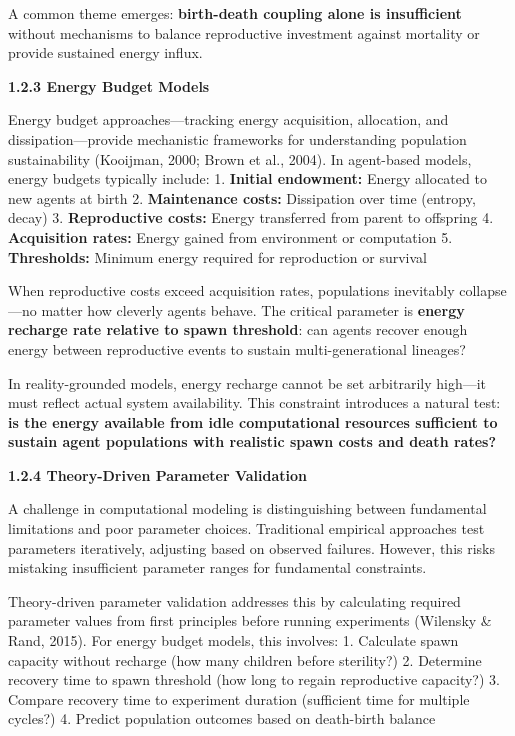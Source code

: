 \documentclass[
]{article}
\begin{document}
A common theme emerges: \textbf{birth-death coupling alone is
insufficient} without mechanisms to balance reproductive investment
against mortality or provide sustained energy influx.

\textbf{1.2.3 Energy Budget Models}

Energy budget approaches---tracking energy acquisition, allocation, and
dissipation---provide mechanistic frameworks for understanding
population sustainability (Kooijman, 2000; Brown et al., 2004). In
agent-based models, energy budgets typically include: 1. \textbf{Initial
endowment:} Energy allocated to new agents at birth 2.
\textbf{Maintenance costs:} Dissipation over time (entropy, decay) 3.
\textbf{Reproductive costs:} Energy transferred from parent to offspring
4. \textbf{Acquisition rates:} Energy gained from environment or
computation 5. \textbf{Thresholds:} Minimum energy required for
reproduction or survival

When reproductive costs exceed acquisition rates, populations inevitably
collapse---no matter how cleverly agents behave. The critical parameter
is \textbf{energy recharge rate relative to spawn threshold}: can agents
recover enough energy between reproductive events to sustain
multi-generational lineages?

In reality-grounded models, energy recharge cannot be set arbitrarily
high---it must reflect actual system availability. This constraint
introduces a natural test: \textbf{is the energy available from idle
computational resources sufficient to sustain agent populations with
realistic spawn costs and death rates?}

\textbf{1.2.4 Theory-Driven Parameter Validation}

A challenge in computational modeling is distinguishing between
fundamental limitations and poor parameter choices. Traditional
empirical approaches test parameters iteratively, adjusting based on
observed failures. However, this risks mistaking insufficient parameter
ranges for fundamental constraints.

Theory-driven parameter validation addresses this by calculating
required parameter values from first principles before running
experiments (Wilensky \& Rand, 2015). For energy budget models, this
involves: 1. Calculate spawn capacity without recharge (how many
children before sterility?) 2. Determine recovery time to spawn
threshold (how long to regain reproductive capacity?) 3. Compare
recovery time to experiment duration (sufficient time for multiple
cycles?) 4. Predict population outcomes based on death-birth balance
\end{document}
